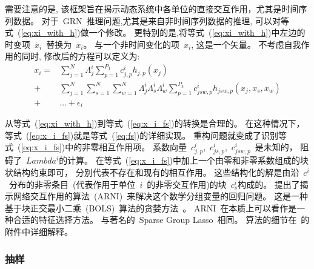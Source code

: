 需要注意的是, 该框架旨在揭示动态系统中各单位的直接交互作用，尤其是时间序列数据。
对于~GRN~推理问题,尤其是来自非时间序列数据的推理,
可以对等式~(\ref{eq:xi_with_h})做一个修改。
更特别的是,将等式~(\ref{eq:xi_with_h})中左边的时变项~$\dot{x_i}$~替换为~$\dot{x_i}$。
与一个非时间变化的项~$x_i$, 这是一个矢量。
不考虑自我作用的同时, 修改后的方程可以定义为:
\begin{equation}
\label{eq:x_i_fs}
\begin{split}
   x_i = &\sum_{j=1}^{N} \Lambda^i_{j} \sum_{p=1}^{P_1} c^i_{j,p}h_{j,p}(x_j)\\  
       + &\sum_{j=1}^{N} \sum_{s=1}^{N} \sum_{w=1}^{N}\Lambda^i_{j}\Lambda^i_{s}\Lambda^i_{w} \sum_{p=1}^{P_3} c^i_{jsw,p}h_{jsw,p}(x_j,x_s,x_w)\\
       +&\ldots + \epsilon_{i}
   \end{split}
\end{equation}

从等式~(\ref{eq:xi_with_h})到等式~(\ref{eq:x_i_fs})的转换是合理的。
在这种情况下，等式~(\ref{eq:x_i_fs})就是等式~(\ref{eq:fs})的详细实现。
重构问题就变成了识别等式~(\ref{eq:x_i_fs})中的非零相互作用项。
系数向量~$c^i_{j,p}$,~$c^i_{js,p}$,~$c^i_{jsw,p}$~是未知的，
阻碍了~$Lambda^i$的计算。
在等式~(\ref{eq:x_i_fs})中加上一个由零和非零系数组成的块状结构约束即可，
分别代表不存在和现有的相互作用。
这些结构化的解是由沿~$c^i$~分布的非零条目~(代表作用于单位~$i$~的非零交互作用)的块~$c^i_s$构成的。
提出了揭示网络交互作用的算法~(ARNI)~来解决这个数学分组变量的回归问题。
这是一种基于块正交最小二乘~(BOLS)~算法的贪婪方法~\cite{majumdar2009fast}。
ARNI~在本质上可以看作是一种合适的特征选择方法。
与著名的~Sparse Group Lasso~\cite{friedman2010note}相同。
算法的细节在~\cite{casadiego2017model}的附件中详细解释。

\subsubsection{抽样}

